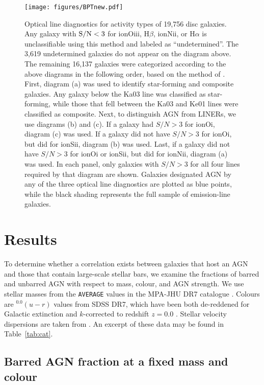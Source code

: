 \begin{figure*}
\texttt{[image: figures/BPTnew.pdf]}
\caption{Optical line diagnostics for activity types of 19,756 disc galaxies. Any galaxy with $\rm S/N < 3$ for ion{O}{iii}, H$\beta$, ion{N}{ii}, or H$\alpha$ is unclassifiable using this method and labeled as ``undetermined''. The 3,619 undetermined galaxies do not appear on the diagram above. The remaining 16,137 galaxies were categorized according to the above diagrams in the following order, based on the method of \citet{Schawinski2007}. First, diagram (a) was used to identify star-forming and composite galaxies. Any galaxy below the Ka03 line was classified as star-forming, while those that fell between the Ka03 and Ke01 lines were classified as composite. Next, to distinguish AGN from LINERs, we use diagrams (b) and (c). If a galaxy had $S/N > 3$ for ion{O}{i}, diagram (c) was used. If a galaxy did not have $S/N > 3$ for ion{O}{i}, but did for ion{S}{ii}, diagram (b) was used. Last, if a galaxy did not have $S/N > 3$ for ion{O}{i} or ion{S}{ii}, but did for ion{N}{ii}, diagram (a) was used. In each panel, only galaxies with $S/N > 3$ for all four lines required by that diagram are shown. Galaxies designated AGN by any of the three optical line diagnostics are plotted as blue points, while the black shading represents the full sample of emission-line galaxies.}
\label{BPT}
\end{figure*}
\section{Results}
\label{sec:Results}

To determine whether a correlation exists between galaxies that host an AGN and those that contain large-scale stellar bars, we examine the fractions of barred and unbarred AGN with respect to mass, colour, and AGN strength. We use stellar masses from the {\tt AVERAGE} values in the MPA-JHU DR7 catalogue \citep{Kauffmann2003}. Colours are $^{0.0}(u-r)$ values from SDSS DR7, which have been both de-reddened for Galactic extinction and $k$-corrected to redshift $z=0.0$ \citep{Csabai2003}. Stellar velocity dispersions are taken from \citet{Oh2011}. An excerpt of these data may be found in Table~\ref{tab:cat}.

\subsection{Barred AGN fraction at a fixed mass and colour}\label{ssec:barredfraction}
 

